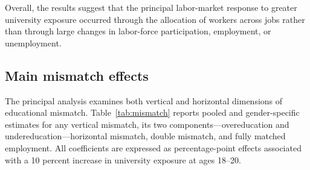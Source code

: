 Overall, the results suggest that the principal labor-market response to greater university exposure occurred through the allocation of workers across jobs rather than through large changes in labor-force participation, employment, or unemployment.

\subsection{Main mismatch effects}

The principal analysis examines both vertical and horizontal dimensions of educational mismatch. Table~\ref{tab:mismatch} reports pooled and gender-specific estimates for any vertical mismatch, its two components---overeducation and undereducation---horizontal mismatch, double mismatch, and fully matched employment. All coefficients are expressed as percentage-point effects associated with a 10 percent increase in university exposure at ages 18--20.

